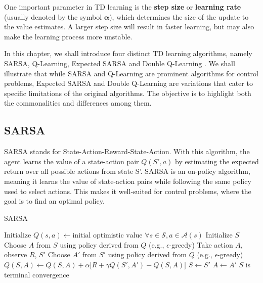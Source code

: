 One important parameter in TD learning is the \textbf{step size} or \textbf{learning rate} (usually denoted by the symbol $\bm{\alpha}$), which determines the size of the update to the value estimates. A larger step size will result in faster learning, but may also make the learning process more unstable.

In this chapter, we shall introduce four distinct TD learning algorithms, namely SARSA, Q-Learning, Expected SARSA and Double Q-Learning  \citep{RLSuttonBarto}. We shall illustrate that while SARSA and Q-Learning are prominent algorithms for control problems, Expected SARSA and Double Q-Learning are variations that cater to specific limitations of the original algorithms. The objective is to highlight both the commonalities and differences among them.

\subsection{SARSA}
SARSA stands for State-Action-Reward-State-Action. With this algorithm, the agent learns the value of a state-action pair $Q(S',a)$ by estimating the expected return over all possible actions from state S'. SARSA is an on-policy algorithm, meaning it learns the value of state-action pairs while following the same policy used to select actions. This makes it well-suited for control problems, where the goal is to find an optimal policy.
\begin{algorithm}
\caption{SARSA}\label{algo:S}
\begin{algorithmic}[1]
\State Initialize 
\State $Q(s,a) \gets \text{initial optimistic value } \forall s\in \mathcal{S}, a\in \mathcal{A}(s)$
\Repeat
\State Initialize $S$
\State Choose $A$ from $S$ using policy derived from $Q$ (e.g., $\epsilon$-greedy)
\Repeat
\State Take action $A$, observe $R$, $S'$
\State Choose $A'$ from $S'$ using policy derived from $Q$ (e.g., $\epsilon$-greedy)
\State $Q(S,A) \gets Q(S,A) + \alpha \big[ R + \gamma Q(S',A') - Q(S,A) \big]$
\State $S \gets S'$
\State $A \gets A'$
\Until $S$ is terminal
\Until convergence
\end{algorithmic}
\end{algorithm}

